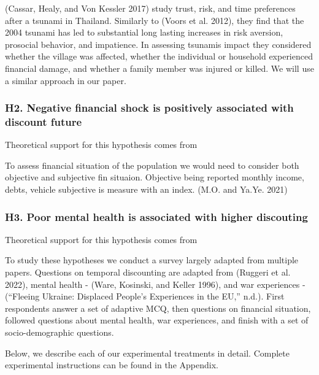 \documentclass[
  letterpaper,
  DIV=11,
  numbers=noendperiod]{scrartcl}
\begin{document}
(Cassar, Healy, and Von Kessler 2017) study trust, risk, and time
preferences after a tsunami in Thailand. Similarly to (Voors et al.
2012), they find that the 2004 tsunami has led to substantial long
lasting increases in risk aversion, prosocial behavior, and impatience.
In assessing tsunamis impact they considered whether the village was
affected, whether the individual or household experienced financial
damage, and whether a family member was injured or killed. We will use a
similar approach in our paper.

\hypertarget{h2.-negative-financial-shock-is-positively-associated-with-discount-future}{%
\subsubsection{H2. Negative financial shock is positively associated
with discount
future}\label{h2.-negative-financial-shock-is-positively-associated-with-discount-future}}

Theoretical support for this hypothesis comes from

To assess financial situation of the population we would need to
consider both objective and subjective fin situaion. Objective being
reported monthly income, debts, vehicle subjective is measure with an
index. (M.O. and Ya.Ye. 2021)

\hypertarget{h3.-poor-mental-health-is-associated-with-higher-discouting}{%
\subsubsection{H3. Poor mental health is associated with higher
discouting}\label{h3.-poor-mental-health-is-associated-with-higher-discouting}}

Theoretical support for this hypothesis comes from

To study these hypotheses we conduct a survey largely adapted from
multiple papers. Questions on temporal discounting are adapted from
(Ruggeri et al. 2022), mental health - (Ware, Kosinski, and Keller
1996), and war experiences - ({``Fleeing Ukraine: Displaced People{'}s
Experiences in the EU,''} n.d.). First respondents answer a set of
adaptive MCQ, then questions on financial situation, followed questions
about mental health, war experiences, and finish with a set of
socio-demographic questions.

Below, we describe each of our experimental treatments in detail.
Complete experimental instructions can be found in the Appendix.
\end{document}
